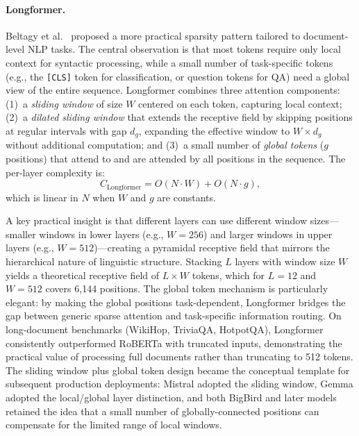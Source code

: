 \paragraph{Longformer.}
Beltagy et al.~\cite{beltagy2020longformer} proposed a more practical sparsity pattern tailored to document-level NLP tasks. The central observation is that most tokens require only local context for syntactic processing, while a small number of task-specific tokens (e.g., the \texttt{[CLS]} token for classification, or question tokens for QA) need a global view of the entire sequence. Longformer combines three attention components: (1)~a \emph{sliding window} of size $W$ centered on each token, capturing local context; (2)~a \emph{dilated sliding window} that extends the receptive field by skipping positions at regular intervals with gap $d_g$, expanding the effective window to $W \times d_g$ without additional computation; and (3)~a small number of \emph{global tokens} ($g$ positions) that attend to and are attended by all positions in the sequence. The per-layer complexity is:
\begin{equation}
C_{\text{Longformer}} = O(N \cdot W) + O(N \cdot g),
\label{eq:longformer-complexity}
\end{equation}
which is linear in $N$ when $W$ and $g$ are constants.

A key practical insight is that different layers can use different window sizes---smaller
windows in lower layers (e.g., $W = 256$) and larger windows in upper layers (e.g.,
$W = 512$)---creating a pyramidal receptive field that mirrors the hierarchical nature of
linguistic structure.
Stacking $L$ layers with window size $W$ yields a theoretical receptive field of
$L \times W$ tokens, which for $L = 12$ and $W = 512$ covers 6,144 positions.
The global token mechanism is particularly elegant: by making the global positions
task-dependent, Longformer bridges the gap between generic sparse attention and
task-specific information routing.
On long-document benchmarks (WikiHop, TriviaQA, HotpotQA), Longformer consistently
outperformed RoBERTa with truncated inputs, demonstrating the practical value of
processing full documents rather than truncating to 512 tokens.
The sliding window plus global token design became the conceptual template for subsequent
production deployments: Mistral adopted the sliding window, Gemma adopted the
local/global layer distinction, and both BigBird and later models retained the idea that
a small number of globally-connected positions can compensate for the limited range of
local windows.

